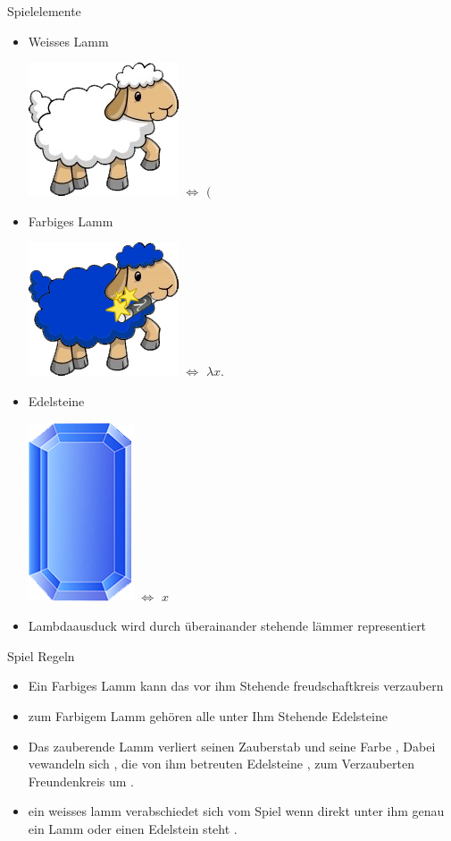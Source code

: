 \documentclass[18pt]{beamer}
\begin{document}
\begin{frame}{Spielelemente}
	\begin{itemize}
	\item Weisses Lamm 
	  
	  \includegraphics[height=1.cm]{Pictures/lamb_white_wom} \thinspace \thinspace \thinspace \thinspace
			 $\Leftrightarrow$ 
			 \thinspace \thinspace \thinspace \thinspace
			$($
	\item Farbiges Lamm 
	
			\includegraphics[height=1.cm]{Pictures/lamb_blue_wm}
			\thinspace \thinspace \thinspace \thinspace
			 $\Leftrightarrow$ 
			 \thinspace \thinspace \thinspace \thinspace
			$\lambda x.$
	\item Edelsteine

			\includegraphics[height=1.cm]{Pictures/gem_blue}
			\thinspace \thinspace \thinspace \thinspace
			 $\Leftrightarrow$ 
			 \thinspace \thinspace \thinspace \thinspace
			$x$
	\item Lambdaausduck wird durch überainander stehende lämmer representiert 
	\end{itemize}
	
\end{frame}

\begin{frame}{Spiel Regeln}
\begin{itemize}
\item Ein Farbiges Lamm kann das vor ihm Stehende freudschaftkreis verzaubern
\item zum Farbigem Lamm gehören alle unter Ihm Stehende Edelsteine 
\item Das zauberende Lamm verliert seinen Zauberstab und seine Farbe , Dabei vewandeln sich , die von ihm betreuten Edelsteine ,   zum Verzauberten Freundenkreis um . 
\item ein weisses lamm verabschiedet sich vom Spiel wenn direkt unter ihm  genau ein Lamm oder einen Edelstein steht .
\end{itemize}
\end{frame}
\end{document}
